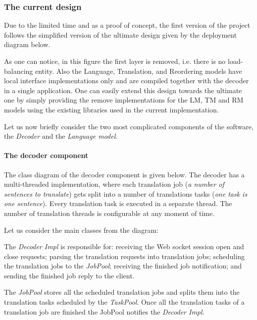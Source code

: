 \subsubsection*{The current design}

Due to the limited time and as a proof of concept, the first version of the project follows the simplified version of the ultimate design given by the deployment diagram below.



As one can notice, in this figure the first layer is removed, i.\+e. there is no load-\/balancing entity. Also the Language, Translation, and Reordering models have local interface implementations only and are compiled together with the decoder in a single application. One can easily extend this design towards the ultimate one by simply providing the remove implementations for the L\+M, T\+M and R\+M models using the existing libraries used in the current implementation.

Let us now briefly consider the two most complicated components of the software, the {\itshape Decoder} and the {\itshape Language model}.

\paragraph*{The decoder component}

The class diagram of the decoder component is given below. The decoder has a multi-\/threaded implementation, where each translation job ({\itshape a number of sentences to translate}) gets split into a number of translations tasks ({\itshape one task is one sentence}). Every translation task is executed in a separate thread. The number of translation threads is configurable at any moment of time.



Let us consider the main classes from the diagram\+:

The {\itshape Decoder Impl} is responsible for\+: receiving the Web socket session open and close requests; parsing the translation requests into translation jobs; scheduling the translation jobs to the {\itshape Job\+Pool}; receiving the finished job notification; and sending the finished job reply to the client.

The {\itshape Job\+Pool} stores all the scheduled translation jobs and splits them into the translation tasks scheduled by the {\itshape Task\+Pool}. Once all the translation tasks of a translation job are finished the Job\+Pool notifies the {\itshape Decoder Impl}.

